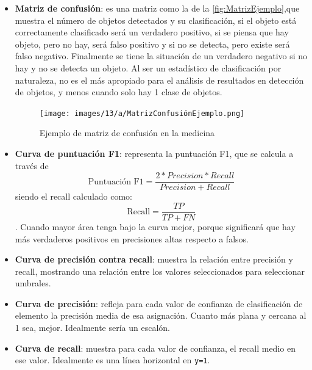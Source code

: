 \begin{itemize}
    \item \textbf{Matriz de confusión}: es una matriz como la de la \autoref{fig:MatrizEjemplo},que muestra el número de objetos detectados y su clasificación, si el objeto está correctamente clasificado será un verdadero positivo, si 
    se piensa que hay objeto, pero no hay, será falso positivo y si no se detecta, pero existe será falso negativo. Finalmente se tiene la situación de un verdadero negativo si no hay y no se detecta un objeto. Al ser un 
    estadístico de clasificación por naturaleza, no es el más apropiado para el análisis de resultados en detección de objetos, y menos cuando solo hay 1 clase de objetos.

    \begin{figure}[H]
        \centering
        \texttt{[image: images/13/a/MatrizConfusiónEjemplo.png]}
        \caption{Ejemplo de matriz de confusión en la medicina}
        \label{fig:MatrizEjemplo}
    \end{figure}

    \item \textbf{Curva de puntuación F1}: representa la puntuación F1, que se calcula a través de \begin{equation*}\text{Puntuación F1} = \frac{2*Precision*Recall}{Precision+Recall}\end{equation*} siendo el recall 
    calculado como: \begin{equation*}\text{Recall} = \frac{TP}{TP+FN}\end{equation*}. Cuando mayor área tenga bajo la curva mejor, porque significará que hay más verdaderos positivos en precisiones altas respecto a falsos.
    \item \textbf{Curva de precisión contra recall}: muestra la relación entre precisión y recall, mostrando una relación entre los valores seleccionados para seleccionar umbrales.
    \item \textbf{Curva de precisión}: refleja para cada valor de confianza de clasificación de elemento la precisión media de esa asignación. Cuanto más plana y cercana al 1 sea, mejor. Idealmente sería un escalón.
    \item \textbf{Curva de recall}: muestra para cada valor de confianza, el recall medio en ese valor. Idealmente es una línea horizontal en \texttt{y=1}.
\end{itemize}

